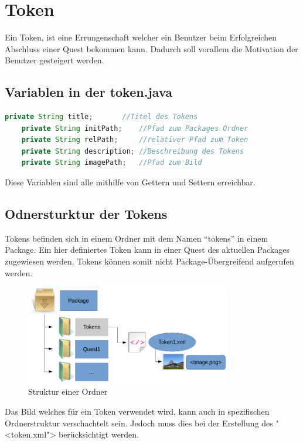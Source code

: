 \section{Token}
Ein Token, ist eine Errungenschaft welcher ein Benutzer beim Erfolgreichen Abschluss einer Quest bekommen kann. Dadurch soll vorallem die Motivation der Benutzer gesteigert werden. 

\subsection{Variablen in der token.java}

\begin{lstlisting}[language=JAVA]
	private String title;		//Titel des Tokens
	private String initPath;	//Pfad zum Packages Ordner 
	private String relPath;		//relativer Pfad zum Token
	private String description;	//Beschreibung des Tokens
	private String imagePath;	//Pfad zum Bild

\end{lstlisting}
Diese Variablen sind alle mithilfe von Gettern und Settern erreichbar.


\subsection{Odnersturktur der Tokens}
Tokens befinden sich in einem Ordner mit dem Namen "`tokens"' in einem Package. Ein hier definiertes Token kann in einer Quest des aktuellen Packages zugewiesen werden. Tokens können somit nicht Package-Übergreifend aufgerufen werden.

\begin{figure}[h] 
  \centering
     \includegraphics[width=0.8\textwidth]{./media/images/quest/token.png}
  \caption{Struktur einer Ordner}
  \label{fig:struct_token}
\end{figure}

Das Bild welches für ein Token verwendet wird, kann auch in spezifischen Ordnerstruktur verschachtelt sein. Jedoch muss dies bei der Erstellung des "<token.xml"> berücksichtigt werden.